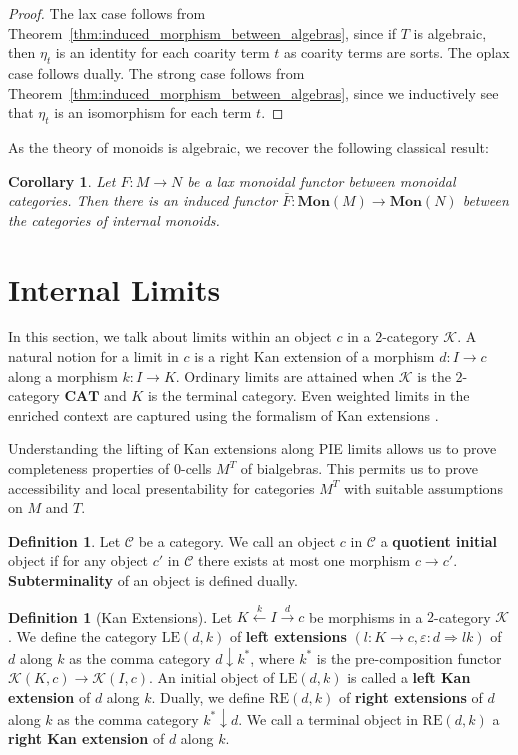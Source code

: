 \documentclass[11pt]{article}
\theoremstyle{plain}
\newtheorem{corollary}[theorem]{Corollary}
\theoremstyle{definition}
\newtheorem{definition}[theorem]{Definition}
\numberwithin{equation}{section}
\newcommand{\C}{\mathcal{C}}
\newcommand{\K}{\mathcal{K}}
\newcommand{\CAT}{\mathbf{CAT}}
\newcommand{\LE}{\mathrm{LE}}
\newcommand{\RE}{\mathrm{RE}}
\newcommand{\Mon}{\mathbf{Mon}}
\begin{document}
\begin{proof}
The lax case follows from Theorem~\ref{thm:induced_morphism_between_algebras}, since if $T$ is algebraic, then $\eta_t$ is an identity for each coarity term $t$ as coarity terms are sorts. The oplax case follows dually. The strong case follows from Theorem~\ref{thm:induced_morphism_between_algebras}, since we inductively see that $\eta_t$ is an isomorphism for each term $t$. 
\end{proof}

As the theory of monoids is algebraic, we recover the following classical result:
\begin{corollary}
   Let $F\colon M\to N$ be a lax monoidal functor between monoidal categories. Then there is an induced functor $\bar{F}\colon \Mon(M)\to \Mon(N)$ between the categories of internal monoids.
\end{corollary}

\section{Internal Limits}
In this section, we talk about limits within an object $c$ in a $2$-category $\K$. A natural notion for a limit in $c$ is a right Kan extension of a morphism $d\colon I\to c$ along a morphism $k\colon I\to K$. Ordinary limits are attained when $\K$ is the $2$-category $\CAT$ and $K$ is the terminal category. Even weighted limits in the enriched context are captured using the formalism of Kan extensions \cite{Kelly:Enriched}.

Understanding the lifting of Kan extensions along PIE limits allows us to prove completeness properties of $0$-cells $M^T$ of bialgebras. This permits us to prove accessibility and local presentability for categories $M^T$ with suitable assumptions on $M$ and $T$.

\begin{definition}
   Let $\C$ be a category. We call an object $c$ in $\C$ a \textbf{quotient initial} object if for any object $c'$ in $\C$ there exists at most one morphism $c\to c'$. \textbf{Subterminality} of an object is defined dually.
\end{definition}
\begin{definition}[Kan Extensions]
   Let $K\xleftarrow{k}I\xrightarrow{d}c$ be morphisms in a $2$-category $\K$. 
       We define the category $\LE(d, k)$ of \textbf{left extensions} $(l\colon K\to c,\varepsilon\colon d\Rightarrow lk)$ of $d$ along $k$ as the comma category $d\downarrow k^*$, where $k^*$ is the pre-composition functor $\K(K,c)\to \K(I,c)$. An initial object of $\LE(d,k)$ is called a \textbf{left Kan extension }of $d$ along $k$. Dually, we define $\RE(d,k)$ of \textbf{right extensions} of $d$ along $k$ as the comma category $k^*\downarrow d$. We call a terminal object in $\RE(d,k)$ a \textbf{right Kan extension} of $d$ along $k$.
\end{definition}
\end{document}
